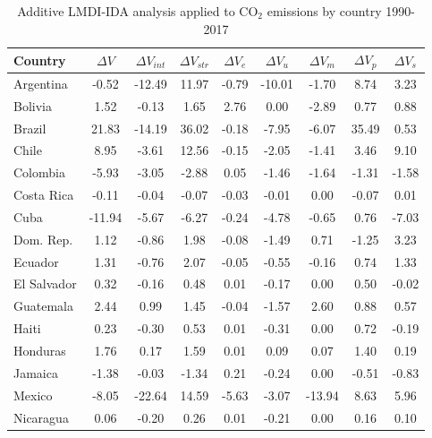 \documentclass[energies,article,accept,moreauthors,12pt,a4paper]{mdpi} %
\begin{document}
  \begin{table}[!h]\label{11}										
\begin{center}\caption{Additive LMDI-IDA analysis applied to CO$_2$ emissions by country 1990-2017}			
\begin{tabular}{l|c|c:c|ccc:cc}\hline	
Country	&$	\Delta V  	$&$	\Delta V_{int}	$&$	\Delta V_{str}	$&$	\Delta V_{e}	$&$	\Delta V_{u}	$&$	\Delta V_{m}	$&$	\Delta V_{p}	$&$	\Delta V_{s}	$\\\hline										
Argentina	&	-0.52	&	-12.49	&	11.97	&	-0.79	&	-10.01	&	-1.70	&	8.74	&	3.23	\\																					
Bolivia	&	1.52	&	-0.13	&	1.65	&	2.76	&	0.00	&	-2.89	&	0.77	&	0.88	\\																					
Brazil	&	21.83	&	-14.19	&	36.02	&	-0.18	&	-7.95	&	-6.07	&	35.49	&	0.53	\\																					
Chile	&	8.95	&	-3.61	&	12.56	&	-0.15	&	-2.05	&	-1.41	&	3.46	&	9.10	\\																					
Colombia	&	-5.93	&	-3.05	&	-2.88	&	0.05	&	-1.46	&	-1.64	&	-1.31	&	-1.58	\\																					
Costa Rica	&	-0.11	&	-0.04	&	-0.07	&	-0.03	&	-0.01	&	0.00	&	-0.07	&	0.01	\\																					
Cuba	&	-11.94	&	-5.67	&	-6.27	&	-0.24	&	-4.78	&	-0.65	&	0.76	&	-7.03	\\																					
Dom. Rep.	&	1.12	&	-0.86	&	1.98	&	-0.08	&	-1.49	&	0.71	&	-1.25	&	3.23	\\																					
Ecuador	&	1.31	&	-0.76	&	2.07	&	-0.05	&	-0.55	&	-0.16	&	0.74	&	1.33	\\																					
El Salvador	&	0.32	&	-0.16	&	0.48	&	0.01	&	-0.17	&	0.00	&	0.50	&	-0.02	\\																					
Guatemala	&	2.44	&	0.99	&	1.45	&	-0.04	&	-1.57	&	2.60	&	0.88	&	0.57	\\																					
Haiti	&	0.23	&	-0.30	&	0.53	&	0.01	&	-0.31	&	0.00	&	0.72	&	-0.19	\\																					
Honduras	&	1.76	&	0.17	&	1.59	&	0.01	&	0.09	&	0.07	&	1.40	&	0.19	\\																					
Jamaica	&	-1.38	&	-0.03	&	-1.34	&	0.21	&	-0.24	&	0.00	&	-0.51	&	-0.83	\\																					
Mexico	&	-8.05	&	-22.64	&	14.59	&	-5.63	&	-3.07	&	-13.94	&	8.63	&	5.96	\\																					
Nicaragua	&	0.06	&	-0.20	&	0.26	&	0.01	&	-0.21	&	0.00	&	0.16	&	0.10	\\																					

\end{tabular}
\end{center}
\end{table}
\end{document}
